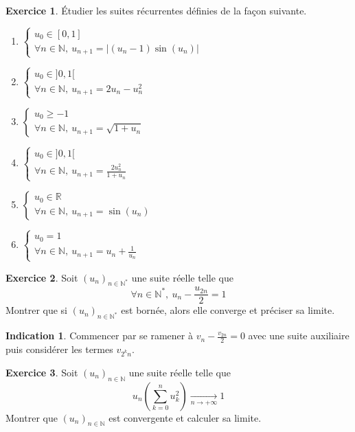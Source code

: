 \documentclass[french]{book}
\newcommand{\N}{\mathbb{N}}
\newcommand{\R}{\mathbb{R}}
\newcommand{\st}{^*}
\theoremstyle{definition}
\newtheorem{ex}{Exercice}[chapter]
\theoremstyle{theorem}
\newtheorem*{ind}{Indication}
\theoremstyle{remark}
\begin{document}
\begin{ex}
	Étudier les suites récurrentes définies de la façon suivante.
	\begin{enumerate}
		\item $\displaystyle\begin{cases}
			u_0\in[0,1] \\
			\forall n\in\N,\ u_{n+1}=\lvert (u_n-1)\sin(u_n)\rvert
		\end{cases}$
		\item $\displaystyle\begin{cases}
			u_0\in]0,1[ \\
			\forall n\in\N,\ u_{n+1}=2u_n-u_n^2
		\end{cases}$
		\item $\displaystyle\begin{cases}
			u_0\geqslant -1 \\
			\forall n\in\N,\ u_{n+1}=\sqrt{1+u_n}
		\end{cases}$
		\item $\displaystyle\begin{cases}
			u_0\in]0,1[ \\
			\forall n\in\N,\ u_{n+1}=\displaystyle\frac{2u_n^2}{1+u_n}
		\end{cases}$
		\item $\displaystyle\begin{cases}
			u_0\in\R \\
			\forall n\in\N,\ u_{n+1}=\sin(u_n)
		\end{cases}$
		\item $\displaystyle\begin{cases}
			u_0=1 \\
			\forall n\in\N,\ u_{n+1}=\displaystyle u_n+\frac{1}{u_n}
		\end{cases}$
	\end{enumerate}
\end{ex}

\begin{ex}
	Soit $(u_n)_{n\in\N\st}$ une suite réelle telle que $$\forall n\in\N\st,\ u_n-\frac{u_{2n}}{2}=1$$ Montrer que si $(u_n)_{n\in\N\st}$ est bornée, alors elle converge et préciser sa limite.
\end{ex}

\begin{ind}
	Commencer par se ramener à $v_n-\displaystyle\frac{v_{2n}}{2}=0$ avec une suite auxiliaire puis considérer les termes $v_{2^kn}$. 
\end{ind}

\begin{ex}
	Soit $(u_n)_{n\in\N}$ une suite réelle telle que $$u_n\left(\sum_{k=0}^{n}u_k^2\right)\xrightarrow[n\to+\infty]{}1$$ Montrer que $(u_n)_{n\in\N}$ est convergente et calculer sa limite.
\end{ex}
\end{document}
